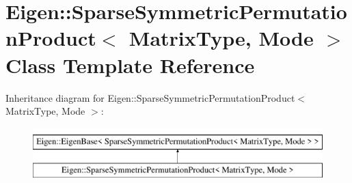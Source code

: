 \hypertarget{class_eigen_1_1_sparse_symmetric_permutation_product}{}\section{Eigen\+::Sparse\+Symmetric\+Permutation\+Product$<$ Matrix\+Type, Mode $>$ Class Template Reference}
\label{class_eigen_1_1_sparse_symmetric_permutation_product}
Inheritance diagram for Eigen\+::Sparse\+Symmetric\+Permutation\+Product$<$ Matrix\+Type, Mode $>$\+:\begin{figure}[H]
\begin{center}
\leavevmode
\includegraphics[height=2.000000cm]{class_eigen_1_1_sparse_symmetric_permutation_product}
\end{center}
\end{figure}

